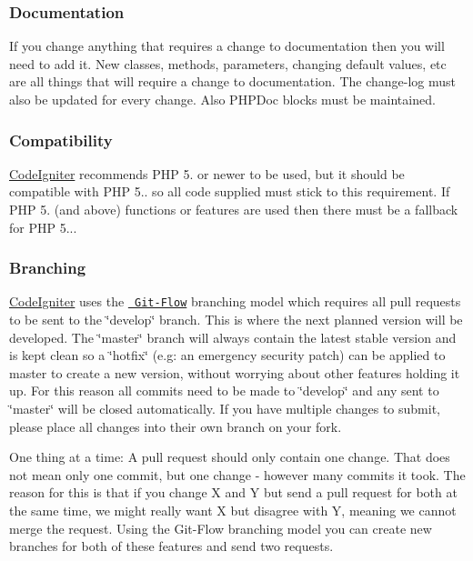 \subsubsection*{Documentation}

If you change anything that requires a change to documentation then you will need to add it. New classes, methods, parameters, changing default values, etc are all things that will require a change to documentation. The change-\/log must also be updated for every change. Also P\+H\+P\+Doc blocks must be maintained.

\subsubsection*{Compatibility}

\mbox{\hyperlink{namespace_code_igniter}{Code\+Igniter}} recommends P\+HP 5. or newer to be used, but it should be compatible with P\+HP 5.. so all code supplied must stick to this requirement. If P\+HP 5. (and above) functions or features are used then there must be a fallback for P\+HP 5...

\subsubsection*{Branching}

\mbox{\hyperlink{namespace_code_igniter}{Code\+Igniter}} uses the \href{http://nvie.com/posts/a-successful-git-branching-model/}{\texttt{ Git-\/\+Flow}} branching model which requires all pull requests to be sent to the \char`\"{}develop\char`\"{} branch. This is where the next planned version will be developed. The \char`\"{}master\char`\"{} branch will always contain the latest stable version and is kept clean so a \char`\"{}hotfix\char`\"{} (e.\+g\+: an emergency security patch) can be applied to master to create a new version, without worrying about other features holding it up. For this reason all commits need to be made to \char`\"{}develop\char`\"{} and any sent to \char`\"{}master\char`\"{} will be closed automatically. If you have multiple changes to submit, please place all changes into their own branch on your fork.

One thing at a time\+: A pull request should only contain one change. That does not mean only one commit, but one change -\/ however many commits it took. The reason for this is that if you change X and Y but send a pull request for both at the same time, we might really want X but disagree with Y, meaning we cannot merge the request. Using the Git-\/\+Flow branching model you can create new branches for both of these features and send two requests.

